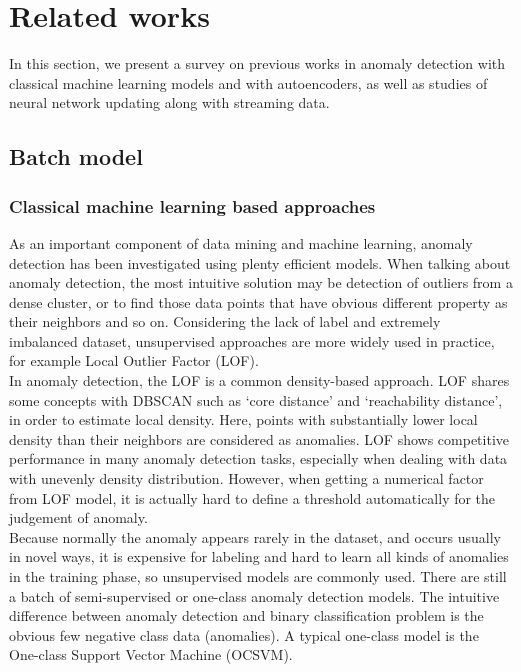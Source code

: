 \chapter{Related works}
\label{chap:relatedworks}

In this section, we present a survey on previous works in anomaly detection with classical machine learning models and with autoencoders, as well as studies of neural network updating along with streaming data.

\section{Batch model}
\label{sec:batch}

\subsection{Classical machine learning based approaches}
\label{sec:classical}

As an important component of data mining and machine learning, anomaly detection has been investigated using plenty efficient models. When talking about anomaly detection, the most intuitive solution may be detection of outliers from a dense cluster, or to find those data points that have obvious different property as their neighbors and so on. Considering the lack of label and extremely imbalanced dataset, unsupervised approaches are more widely used in practice,
for example Local Outlier Factor (LOF).\\

In anomaly detection, the LOF is a common density-based approach. LOF shares some concepts with DBSCAN such as ‘core distance’ and ‘reachability distance’, in order to estimate local density. Here, points with substantially lower local density than their neighbors are considered as anomalies. LOF shows competitive performance in many anomaly detection tasks, especially when dealing with data with unevenly density distribution. However, when getting a numerical factor from LOF model, it is actually hard to define a threshold automatically for the judgement of anomaly.\\

Because normally the anomaly appears rarely in the dataset, and occurs usually in novel ways, it is expensive for labeling and hard to learn all kinds of anomalies in the training phase, so unsupervised models are commonly used. There are still a batch of semi-supervised or one-class anomaly detection models. The intuitive difference between anomaly detection and binary classification problem is the obvious few negative class data (anomalies). A typical one-class model is the One-class Support Vector Machine (OCSVM).\\

